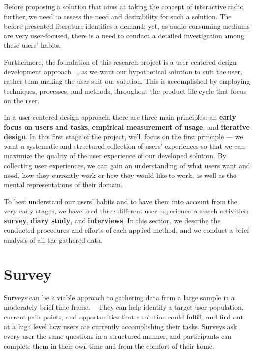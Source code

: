 \cleardoublepage
\label{chap:userresearch}

Before proposing a solution that aims at taking the concept of interactive radio further, we need to assess the need and desirability for such a solution. The before-presented literature identifies a demand; yet, as audio consuming mediums are very user-focused, there is a need to conduct a detailed investigation among these users' habits.

Furthermore, the foundation of this research project is a user-centered design development approach ~\cite{McLoone2010}, as we want our hypothetical solution to suit the user, rather than making the user suit our solution. This is accomplished by employing techniques, processes, and methods, throughout the product life cycle that focus on the user. ~\cite{Courage2005} 

In a user-centered design approach, there are three main principles: an \textbf{early focus on users and tasks}, \textbf{empirical measurement of usage}, and \textbf{iterative design}. In this first stage of the project, we'll focus on the first principle — we want a systematic and structured collection of users’ experiences so that we can maximize the quality of the user experience of our developed solution. By collecting user experiences, we can gain an understanding of what users want and need, how they currently work or how they would like to work, as well as the mental representations of their domain.

To best understand our users' habits and to have them into account from the very early stages, we have used three different user experience research activities: \textbf{survey}, \textbf{diary study}, and \textbf{interviews}. In this section, we describe the conducted procedures and efforts of each applied method, and we conduct a brief analysis of all the gathered data.


\section{Survey}
Surveys can be a viable approach to gathering data from a large sample in a moderately brief time frame. ~\cite{Courage2005} They can help identify a target user population, current pain points, and opportunities that a solution could fulfill, and find out at a high level how users are currently accomplishing their tasks. Surveys ask every user the same questions in a structured manner, and participants can complete them in their own time and from the comfort of their home.

